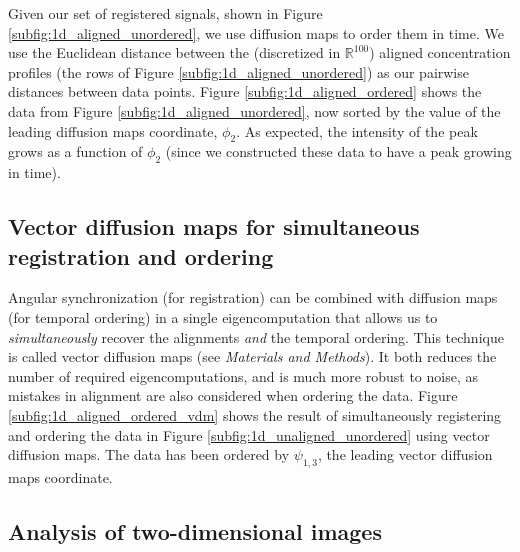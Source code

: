 \documentclass{pnastwo}
\begin{document}
\begin{article}
Given our set of registered signals, shown in Figure \ref{subfig:1d_aligned_unordered}, we use diffusion maps to order them in time.
%
We use the Euclidean distance between the (discretized in $\mathbb{R}^{100}$) aligned concentration profiles (the rows of Figure \ref{subfig:1d_aligned_unordered}) as our pairwise distances between data points.
%
Figure \ref{subfig:1d_aligned_ordered} shows the data from Figure \ref{subfig:1d_aligned_unordered}, now sorted by the value of the leading diffusion maps coordinate, $\phi_2$.
%
As expected, the intensity of the peak grows as a function of $\phi_2$ (since we constructed these data
to have a peak growing in time).
%
%

\subsection{Vector diffusion maps for simultaneous registration and ordering}

%
%
Angular synchronization (for registration) can be combined with diffusion maps (for temporal ordering) in a single eigencomputation that allows us to {\em simultaneously} recover the alignments {\em and} the temporal ordering.
%
This technique is called vector diffusion maps \cite{singer2012vector} (see {\it Materials and Methods}).
%
It both reduces the number of required eigencomputations, and is much more robust to noise, as mistakes in alignment are also considered when ordering the data.
%
Figure \ref{subfig:1d_aligned_ordered_vdm} shows the result of simultaneously registering and ordering the data in Figure \ref{subfig:1d_unaligned_unordered} using vector diffusion maps.
%
The data has been ordered by $\psi_{1, 3}$, the leading vector diffusion maps coordinate.

\subsection{Analysis of two-dimensional images}


\end{article}
\end{document}
